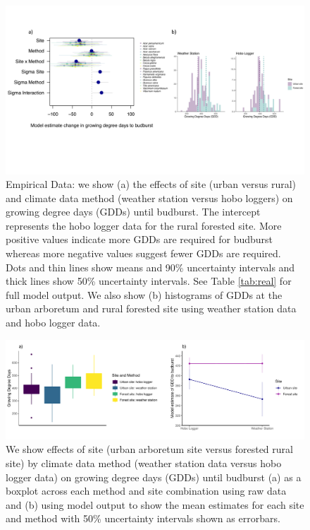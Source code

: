 \documentclass{article}\usepackage[]{graphicx}\usepackage[]{color}
\begin{document}
\begin{figure}[H]
    \centering
    \includegraphics[width=16cm, trim=0cm 5cm 0cm 0cm,]{..//analyses/figures/muandgdd.pdf}
\caption{ Empirical Data: we show (a) the effects of site (urban versus rural) and climate data method (weather station versus hobo loggers) on growing degree days (GDDs) until budburst. The intercept represents the hobo logger data for the rural forested site. More positive values indicate more GDDs are required for budburst whereas more negative values suggest fewer GDDs are required. Dots and thin lines show means and 90\% uncertainty intervals and thick lines show 50\% uncertainty intervals. See Table \ref{tab:real} for full model output. We also show (b) histograms of GDDs at the urban arboretum and rural forested site using weather station data and hobo logger data.}
\label{fig:real}
\end{figure}

\begin{figure}[H]
      \centering
      \includegraphics[width=16cm]{..//analyses/figures/gdd_interaction.pdf}
\caption{ We show effects of site (urban arboretum site versus forested rural site) by climate data method (weather station data versus hobo logger data) on growing degree days (GDDs) until budburst (a) as a boxplot across each method and site combination using raw data and (b) using model output to show the mean estimates for each site and method with 50\% uncertainty intervals shown as errorbars.}
\label{fig:interaction}
\end{figure}
\end{document}
